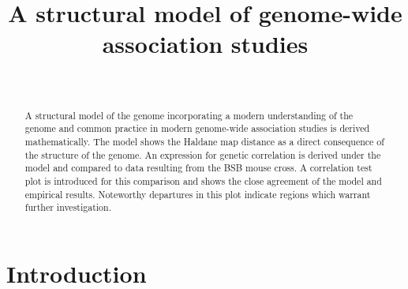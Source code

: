 \documentclass[sts]{imsart}
\begin{document}
\begin{frontmatter}
\title{A structural model of genome-wide association studies}

\begin{aug}
\author[A]{~}%
\address[A]{Chris Salahub is a PhD Candidate in Statistics, Statistics
  and Actuarial Science, University of Waterloo, Waterloo,
  Canada.}
\end{aug}

\begin{abstract}
A structural model of the genome incorporating a modern understanding of the genome and common practice in modern genome-wide association studies is derived mathematically. The model shows the Haldane map distance as a direct consequence of the structure of the genome. An expression for genetic correlation is derived under the model and compared to data resulting from the BSB mouse cross. A correlation test plot is introduced for this comparison and shows the close agreement of the model and empirical results. Noteworthy departures in this plot indicate regions which warrant further investigation.
\end{abstract}

\begin{keyword}
\end{keyword}

\end{frontmatter}

\section{Introduction} \label{sec:intro}
\end{document}
